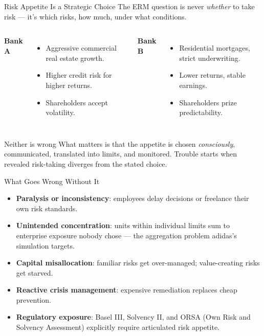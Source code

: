 \documentclass[11pt, aspectratio=169]{beamer}
\begin{document}
\begin{frame}{Risk Appetite Is a Strategic Choice}
The ERM question is never \emph{whether} to take risk --- it's \alert{which risks, how much, under what conditions}.
\medskip
\begin{columns}[T]
\textbf{Bank A}
\begin{itemize}
  \item Aggressive commercial real estate growth.
  \item Higher credit risk for higher returns.
  \item Shareholders accept volatility.
\end{itemize}
\textbf{Bank B}
\begin{itemize}
  \item Residential mortgages, strict underwriting.
  \item Lower returns, stable earnings.
  \item Shareholders prize predictability.
\end{itemize}
\end{columns}
\medskip
\begin{block}{Neither is wrong}
What matters is that the appetite is chosen \emph{consciously}, communicated, translated into limits, and monitored. Trouble starts when revealed risk-taking diverges from the stated choice.
\end{block}
\end{frame}

\begin{frame}{What Goes Wrong Without It}
\begin{itemize}
  \item \textbf{Paralysis or inconsistency}: employees delay decisions or freelance their own risk standards.
  \item \textbf{Unintended concentration}: units within individual limits sum to enterprise exposure nobody chose --- the aggregation problem adidas's simulation targets.
  \item \textbf{Capital misallocation}: familiar risks get over-managed; value-creating risks get starved.
  \item \textbf{Reactive crisis management}: expensive remediation replaces cheap prevention.
  \item \textbf{Regulatory exposure}: Basel III, Solvency II, and \alert{ORSA} (Own Risk and Solvency Assessment) explicitly require articulated risk appetite.
\end{itemize}
\end{frame}
\end{document}
